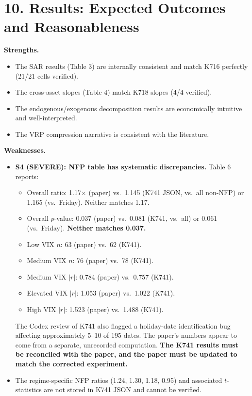 \documentclass[12pt,a4paper]{article}
\begin{document}
\section*{10. Results: Expected Outcomes and Reasonableness}

\textbf{Strengths.}
\begin{itemize}[nosep]
  \item The SAR results (Table 3) are internally consistent and match K716 perfectly (21/21 cells verified).
  \item The cross-asset slopes (Table 4) match K718 slopes (4/4 verified).
  \item The endogenous/exogenous decomposition results are economically intuitive and well-interpreted.
  \item The VRP compression narrative is consistent with the literature.
\end{itemize}

\textbf{Weaknesses.}
\begin{itemize}[nosep]
  \item \textcolor{errorred}{\textbf{S4 (SEVERE): NFP table has systematic discrepancies.}}  Table 6 reports:
  \begin{itemize}[nosep]
    \item Overall ratio: 1.17$\times$ (paper) vs.\ 1.145 (K741 JSON, vs.\ all non-NFP) or 1.165 (vs.\ Friday).  Neither matches 1.17.
    \item Overall $p$-value: 0.037 (paper) vs.\ 0.081 (K741, vs.\ all) or 0.061 (vs.\ Friday).  \textbf{Neither matches 0.037.}
    \item Low VIX $n$: 63 (paper) vs.\ 62 (K741).
    \item Medium VIX $n$: 76 (paper) vs.\ 78 (K741).
    \item Medium VIX $|r|$: 0.784 (paper) vs.\ 0.757 (K741).
    \item Elevated VIX $|r|$: 1.053 (paper) vs.\ 1.022 (K741).
    \item High VIX $|r|$: 1.523 (paper) vs.\ 1.488 (K741).
  \end{itemize}
  The Codex review of K741 also flagged a holiday-date identification bug affecting approximately 5--10 of 195 dates.  The paper's numbers appear to come from a separate, unrecorded computation.  \textbf{The K741 results must be reconciled with the paper, and the paper must be updated to match the corrected experiment.}
  \item The regime-specific NFP ratios (1.24, 1.30, 1.18, 0.95) and associated $t$-statistics are not stored in K741 JSON and cannot be verified.
\end{itemize}
\end{document}
